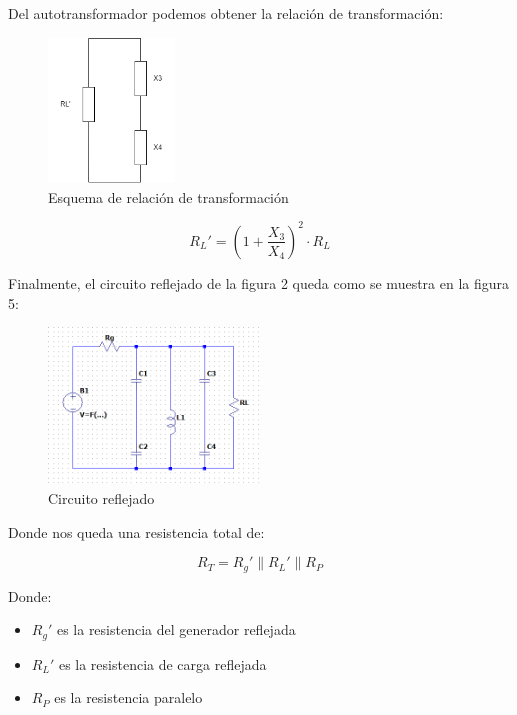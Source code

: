 Del autotransformador podemos obtener la relación de transformación:

\begin{figure}[h]
    \centering
    \includegraphics[width=0.3\textwidth]{Imagenes/relacion_transformacion.png}
    \caption{Esquema de relación de transformación}
\end{figure}

\begin{equation}
    R_L' = (1 + \frac{X_3}{X_4})^2 \cdot R_L 
\end{equation}


Finalmente, el circuito reflejado de la figura 2 queda como se muestra en la figura 5:

\newpage
\begin{figure}[h]
    \centering
    \includegraphics[width=0.5\textwidth]{Imagenes/circuito_reflejado.png}
    \caption{Circuito reflejado}
\end{figure}



Donde nos queda una resistencia total de:

\begin{equation}
    R_T = R_g' \parallel R_L' \parallel R_P
\end{equation}

Donde:

\begin{itemize}
    \item $R_g'$ es la resistencia del generador reflejada
    \item $R_L'$ es la resistencia de carga reflejada
    \item $R_P$ es la resistencia paralelo
\end{itemize}

